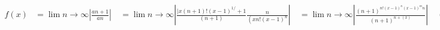 $\begin{aligned} f(x) & =\lim {n \rightarrow \infty}\left|\frac{a{n+1}}{an}\right| \ & =\lim {n \rightarrow \infty}\left|\frac{\mid x(n+1) !(x-1)^{1 /}+1}{(n+1)} \frac{n}{\left(x n !(x-1)^n\right.}\right| \ & =\lim {n \rightarrow \infty}\left|\frac{(n+1)^{n !(x-1)^n(x-1)^m n}}{(n+1)^{n+(x)}}\right| \ & =|x-1| \lim {n \rightarrow \infty} n>1 \text { always diverges }\end{aligned}$
